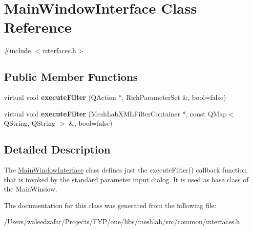 \hypertarget{class_main_window_interface}{}\section{Main\+Window\+Interface Class Reference}
\label{class_main_window_interface}


{\ttfamily \#include $<$interfaces.\+h$>$}

\subsection*{Public Member Functions}
\begin{DoxyCompactItemize}
\item 
\mbox{\label{class_main_window_interface_a9a94ff4a72bd0909dfb8d069e50637a2}} 
virtual void {\bfseries execute\+Filter} (Q\+Action $\ast$, Rich\+Parameter\+Set \&, bool=false)
\item 
\mbox{\label{class_main_window_interface_a41282a5008e885318c8961be4a29a92b}} 
virtual void {\bfseries execute\+Filter} (Mesh\+Lab\+X\+M\+L\+Filter\+Container $\ast$, const Q\+Map$<$ Q\+String, Q\+String $>$ \&, bool=false)
\end{DoxyCompactItemize}


\subsection{Detailed Description}
The \hyperlink{class_main_window_interface}{Main\+Window\+Interface} class defines just the execute\+Filter() callback function that is invoked by the standard parameter input dialog. It is used as base class of the Main\+Window. 

The documentation for this class was generated from the following file\+:\begin{DoxyCompactItemize}
\item 
/\+Users/waleedzafar/\+Projects/\+F\+Y\+P/one/libs/meshlab/src/common/interfaces.\+h\end{DoxyCompactItemize}

